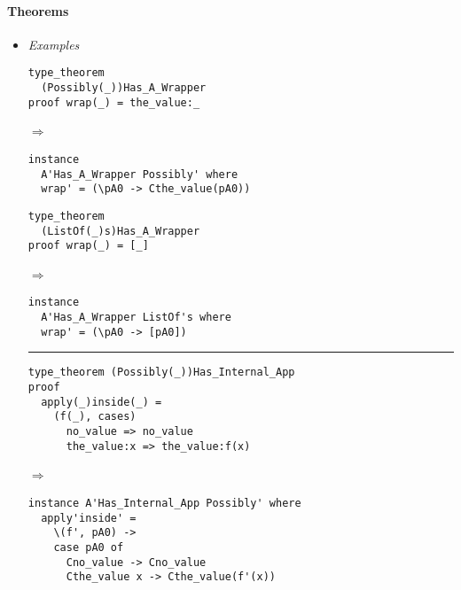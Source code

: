 \documentclass[diploma]{softlab-thesis}
\def\lra{$\Longrightarrow$\ }
\begin{document}
\newpage
\paragraph{Theorems}

\begin{itemize}

\item
\textit{Examples}\\

\begin{minipage}{0.45\linewidth}

\begin{verbatim}
type_theorem
  (Possibly(_))Has_A_Wrapper
proof wrap(_) = the_value:_
\end{verbatim}

\lra

\begin{verbatim}
instance
  A'Has_A_Wrapper Possibly' where
  wrap' = (\pA0 -> Cthe_value(pA0))

\end{verbatim}

\end{minipage}
\hfill\vline\hfill
\begin{minipage}{0.50\linewidth}

\begin{verbatim}
type_theorem
  (ListOf(_)s)Has_A_Wrapper
proof wrap(_) = [_]
\end{verbatim}

\lra

\begin{verbatim}
instance
  A'Has_A_Wrapper ListOf's where
  wrap' = (\pA0 -> [pA0])

\end{verbatim}

\end{minipage}

\rule{\linewidth}{0.1pt}

\begin{verbatim}
type_theorem (Possibly(_))Has_Internal_App
proof
  apply(_)inside(_) =
    (f(_), cases)
      no_value => no_value
      the_value:x => the_value:f(x)
\end{verbatim}

\lra

\begin{verbatim}
instance A'Has_Internal_App Possibly' where
  apply'inside' =
    \(f', pA0) ->
    case pA0 of
      Cno_value -> Cno_value
      Cthe_value x -> Cthe_value(f'(x))
\end{verbatim}



\end{itemize}
\end{document}
